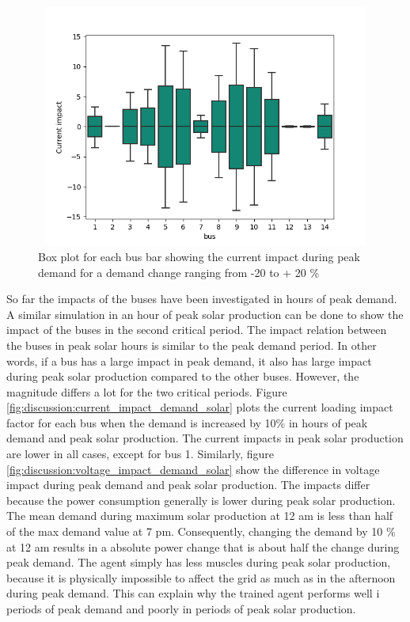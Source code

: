 \documentclass[class=book, crop=false, 11pt]{standalone}
\begin{document}
\begin{figure}[h]
    \center
\includegraphics[height=8cm, width=12cm]{figures/current_impact.png}
    \caption[size = 9]{Box plot for each bus bar showing the current impact during peak demand for a demand change ranging from -20 to + 20 \%}
    \label{fig:discussion:current_impact}
\end{figure}

So far the impacts of the buses have been investigated in hours of peak demand. A similar simulation in an hour of peak solar production can be done to show the impact of the buses in the second critical period. The impact relation between the buses in peak solar hours is similar to the peak demand period. In other words, if a bus has a large impact in peak demand, it also has large impact during peak solar production compared to the other buses. However, the magnitude differs a lot for the two critical periods. Figure \ref{fig:discussion:current_impact_demand_solar} plots the current loading impact factor for each bus when the demand is increased by 10\% in hours of peak demand and peak solar production. The current impacts in peak solar production are lower in all cases, except for bus 1. Similarly, figure     \ref{fig:discussion:voltage_impact_demand_solar} show the difference in voltage impact during peak demand and peak solar production. The impacts differ because the power consumption generally is lower during peak solar production. The mean demand during maximum solar production at 12 am is less than half of the max demand value at 7 pm. Consequently, changing the demand by 10 \% at 12 am results in a absolute power change that is about half the change during peak demand. The agent simply has less muscles during peak solar production, because it is physically impossible to affect the grid as much as in the afternoon during peak demand. This can explain why the trained agent performs well i periods of peak demand and poorly in periods of peak solar production.
\end{document}
